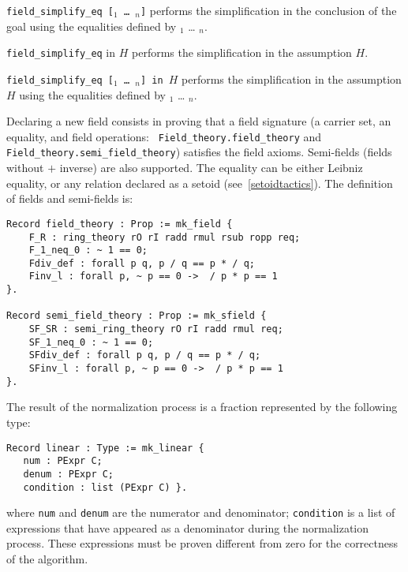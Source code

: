\begin{Variants}
  \item {\tt field\_simplify\_eq   [\term$_1$ {\ldots} \term$_n$]}
     performs the simplification in the conclusion of the goal using
    the equalities
    defined by \term$_1$ {\ldots} \term$_n$. 

  \item {\tt field\_simplify\_eq} in $H$
     performs the simplification in the assumption $H$.

  \item {\tt field\_simplify\_eq   [\term$_1$ {\ldots} \term$_n$] in $H$}
     performs the simplification in the assumption $H$ using
    the equalities
    defined by \term$_1$ {\ldots} \term$_n$. 
\end{Variants}


Declaring a new field consists in proving that a field signature (a
carrier set, an equality, and field operations: {\tt
Field\_theory.field\_theory} and {\tt Field\_theory.semi\_field\_theory})
satisfies the field axioms. Semi-fields (fields without $+$ inverse) are
also supported. The equality can be either Leibniz equality, or any
relation declared as a setoid (see~\ref{setoidtactics}). The definition
of fields and semi-fields is:
\begin{verbatim}
Record field_theory : Prop := mk_field {
    F_R : ring_theory rO rI radd rmul rsub ropp req;
    F_1_neq_0 : ~ 1 == 0;
    Fdiv_def : forall p q, p / q == p * / q;
    Finv_l : forall p, ~ p == 0 ->  / p * p == 1
}.

Record semi_field_theory : Prop := mk_sfield {
    SF_SR : semi_ring_theory rO rI radd rmul req;
    SF_1_neq_0 : ~ 1 == 0;
    SFdiv_def : forall p q, p / q == p * / q;
    SFinv_l : forall p, ~ p == 0 ->  / p * p == 1
}.
\end{verbatim}

The result of the normalization process is a fraction represented by
the following type:
\begin{verbatim}
Record linear : Type := mk_linear {
   num : PExpr C;
   denum : PExpr C;
   condition : list (PExpr C) }.
\end{verbatim}
where {\tt num} and {\tt denum} are the numerator and denominator;
{\tt condition} is a list of expressions that have appeared as a
denominator during the normalization process. These expressions must
be proven different from zero for the correctness of the algorithm.

